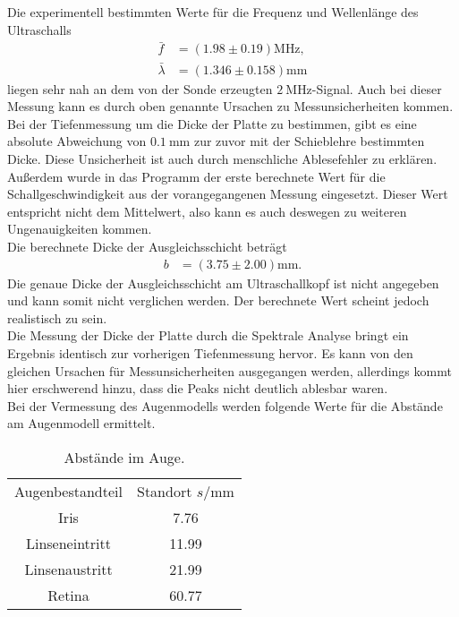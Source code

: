 Die experimentell bestimmten Werte für die Frequenz und Wellenlänge des Ultraschalls
\begin{align*}
    \bar{f} &= (1.98 \pm 0.19) \si{\mega\hertz},\\
    \bar{\lambda} &= (1.346 \pm 0.158) \si{\milli\meter}
\end{align*}
liegen sehr nah an dem von der Sonde erzeugten $\qty{2}{\mega\hertz}$-Signal.
Auch bei dieser Messung kann es durch oben genannte Ursachen zu Messunsicherheiten kommen.
Bei der Tiefenmessung um die Dicke der Platte zu bestimmen, gibt es eine absolute Abweichung von $\qty{0.1}{\milli\meter}$ zur 
zuvor mit der Schieblehre bestimmten Dicke. Diese Unsicherheit ist auch durch menschliche Ablesefehler zu erklären.
Außerdem wurde in das Programm der erste berechnete Wert für die Schallgeschwindigkeit aus der vorangegangenen Messung eingesetzt.
Dieser Wert entspricht nicht dem Mittelwert, also kann es auch deswegen zu weiteren Ungenauigkeiten kommen.\\

Die berechnete Dicke der Ausgleichsschicht beträgt
\begin{align*}
 b &= (3.75\pm 2.00) \si{\milli\meter}.   
\end{align*}
Die genaue Dicke der Ausgleichsschicht am Ultraschallkopf ist nicht angegeben und kann somit nicht verglichen werden. Der berechnete 
Wert scheint jedoch realistisch zu sein.\\

Die Messung der Dicke der Platte durch die Spektrale Analyse bringt ein Ergebnis identisch zur vorherigen Tiefenmessung hervor.
Es kann von den gleichen Ursachen für Messunsicherheiten ausgegangen werden, allerdings kommt hier erschwerend hinzu, dass die Peaks 
nicht deutlich ablesbar waren.\\

Bei der Vermessung des Augenmodells werden folgende Werte für die Abstände am Augenmodell ermittelt.
\begin{table}[H]
    \centering
    \caption{Abstände im Auge.}
    \label{tab:Auge}
    \begin{tabular}{c S[table-format=2.2] }
    \toprule
    {Augenbestandteil} & {Standort $s / \si{\milli\meter}$} \\
    Iris            &  7.76\\
    Linseneintritt  &  11.99\\
    Linsenaustritt  &  21.99\\
    Retina          &  60.77\\
    \bottomrule
    \end{tabular}
 \end{table}

